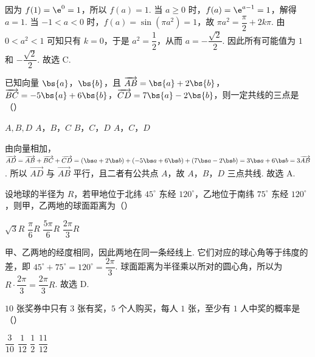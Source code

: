 \begin{solution}
因为 \(f(1)=\e^{0}=1\)，所以 \(f(a)=1\). 当 \(a\geqslant0\) 时，\(f(a)=\e^{a-1}=1\)，解得 \(a=1\). 当 \(-1<a<0\) 时，\(f(a)=\sin(\pi a^2)=1\)，故 \(\pi a^2=\dfrac{\pi}{2}+2k\pi\). 由 \(0<a^2<1\) 可知只有 \(k=0\)，于是 \(a^2=\dfrac{1}{2}\)，从而 \(a=-\dfrac{\sqrt{2}}{2}\). 因此所有可能值为 \(1\) 和 \(-\dfrac{\sqrt{2}}{2}\). 故选 C.
\end{solution}

\begin{problem}
已知向量 \(\bs{a}\)，\(\bs{b}\)，且 \(\overrightarrow{AB}=\bs{a}+2\bs{b}\)，\(\overrightarrow{BC}=-5\bs{a}+6\bs{b}\)，\(\overrightarrow{CD}=7\bs{a}-2\bs{b}\)，则一定共线的三点是（\quad）

\choices
    {\(A,B,D\)}
    {\(A\)，\(B\)，\(C\)}
    {\(B\)，\(C\)，\(D\)}
    {\(A\)，\(C\)，\(D\)}
\end{problem}

\begin{solution}
由向量相加，
\(\overrightarrow{AD}=\overrightarrow{AB}+\overrightarrow{BC}+\overrightarrow{CD}=(\bs a+2\bs b)+(-5\bs a+6\bs b)+(7\bs a-2\bs b)=3\bs a+6\bs b=3\overrightarrow{AB}\).
所以 \(\overrightarrow{AD}\) 与 \(\overrightarrow{AB}\) 平行，且二者有公共点 \(A\)，故 \(A\)，\(B\)，\(D\) 三点共线. 故选 A.
\end{solution}

\begin{problem}
设地球的半径为 \(R\)，若甲地位于北纬 \(45^{\circ}\) 东经 \(120^{\circ}\)，乙地位于南纬 \(75^{\circ}\) 东经 \(120^{\circ}\)，则甲，乙两地的球面距离为（\quad）

\choices
    {\(\sqrt{3}R\)}
    {\(\dfrac{\pi}{6}R\)}
    {\(\dfrac{5\pi}{6}R\)}
    {\(\dfrac{2\pi}{3}R\)}
\end{problem}

\begin{solution}
甲、乙两地的经度相同，因此两地在同一条经线上. 它们对应的球心角等于纬度的差，即 \(45^{\circ}+75^{\circ}=120^{\circ}=\dfrac{2\pi}{3}\). 球面距离为半径乘以所对的圆心角，所以为 \(R\cdot\dfrac{2\pi}{3}=\dfrac{2\pi}{3}R\). 故选 D.
\end{solution}

\begin{problem}
\(10\) 张奖券中只有 \(3\) 张有奖，\(5\) 个人购买，每人 \(1\) 张，至少有 \(1\) 人中奖的概率是（\quad）

\choices
    {\(\dfrac{3}{10}\)}
    {\(\dfrac{1}{12}\)}
    {\(\dfrac{1}{2}\)}
    {\(\dfrac{11}{12}\)}
\end{problem}

